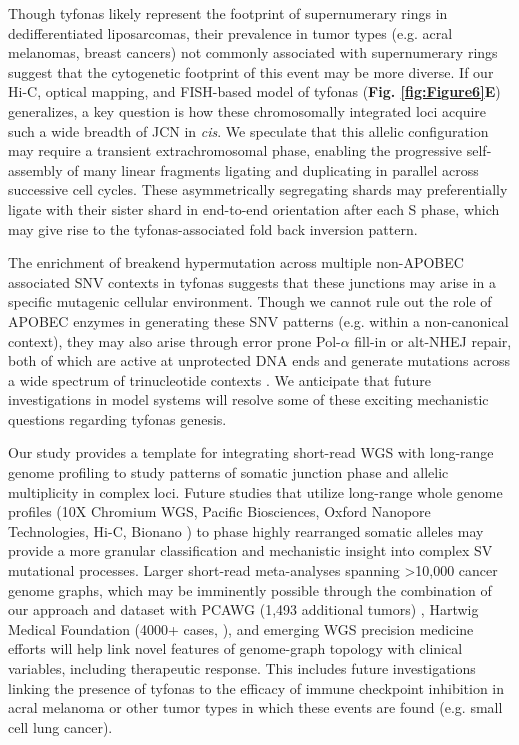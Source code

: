 \documentclass[phd,tocprelim]{cornell}
\begin{document}
Though tyfonas likely represent the footprint of supernumerary rings in dedifferentiated liposarcomas, their prevalence in tumor types (e.g. acral melanomas, breast cancers) not commonly associated with supernumerary rings suggest that the cytogenetic footprint of this event may be more diverse. If our Hi-C, optical mapping, and FISH-based model of tyfonas (\textbf{Fig. \ref{fig:Figure6}E}) generalizes, a key question is how these chromosomally integrated loci acquire such a wide breadth of JCN in \textit{cis}. We speculate that this allelic configuration may require a transient extrachromosomal phase, enabling the progressive self-assembly of many linear fragments ligating and duplicating in parallel across successive cell cycles.  These asymmetrically segregating shards may preferentially ligate with their sister shard in end-to-end orientation after each S phase, which may give rise to the tyfonas-associated fold back inversion pattern.  

The enrichment of breakend hypermutation across multiple non-APOBEC associated SNV contexts in tyfonas suggests that these junctions may arise in a specific mutagenic cellular environment.  Though we cannot rule out the role of APOBEC enzymes in generating these SNV patterns (e.g. within a non-canonical context), they may also arise through error prone Pol-$\alpha$ fill-in or alt-NHEJ repair, both of which are active at unprotected DNA ends and generate mutations across a wide spectrum of trinucleotide contexts \cite{sfeir2012,Mirman:2018jm}.  We anticipate that future investigations in model systems will resolve some of these exciting mechanistic questions regarding tyfonas genesis.

Our study provides a template for integrating short-read WGS with long-range genome profiling to study patterns of somatic junction phase and allelic multiplicity in complex loci. Future studies that utilize long-range whole genome profiles (10X Chromium WGS, Pacific Biosciences, Oxford Nanopore Technologies, Hi-C, Bionano \mbox{\cite{Sedlazeck2018-ix}}) to phase highly rearranged somatic alleles may provide a more granular classification and mechanistic insight into complex SV mutational processes.  Larger short-read meta-analyses spanning >10,000 cancer genome graphs, which may be imminently possible through the combination of our approach and dataset with PCAWG (1,493 additional tumors) \cite{pcawg_marker2020-yi}, Hartwig Medical Foundation (4000+ cases, \cite{Priestley:20196a6}), and emerging WGS precision medicine efforts will help link novel features of genome-graph topology with clinical variables, including therapeutic response. This includes future investigations linking the presence of tyfonas to the efficacy of immune checkpoint inhibition in acral melanoma or other tumor types in which these events are found (e.g. small cell lung cancer).
\end{document}
